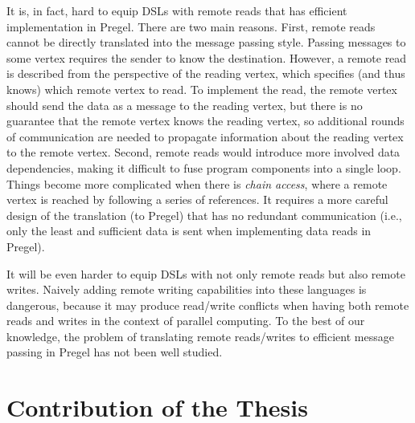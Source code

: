 \documentclass{sokendai_thesis} %
\begin{document}
It is, in fact, hard to equip DSLs with remote reads that has efficient implementation in Pregel.
There are two main reasons.
First, remote reads cannot be directly translated into the message passing style.
Passing messages to some vertex requires the sender to know the destination.
However, a remote read is described from the perspective of the reading vertex, which specifies (and thus knows) which remote vertex to read.
To implement the read, the remote vertex should send the data as a message to the reading vertex, but there is no guarantee that the remote vertex knows the reading vertex, so additional rounds of communication are needed to propagate information about the reading vertex to the remote vertex.
Second, remote reads would introduce more involved data dependencies, making it difficult to fuse program components into a single loop.
Things become more complicated when there is \emph{chain access}, where a remote vertex is reached by following a series of references.
It requires a more careful design of the translation (to Pregel) that has no redundant communication (i.e., only the least and sufficient data is sent when implementing data reads in Pregel).

It will be even harder to equip DSLs with not only remote reads but also remote writes.
Naively adding remote writing capabilities into these languages is dangerous, because it may produce read/write conflicts when having both remote reads and writes in the context of parallel computing.
To the best of our knowledge, the problem of translating remote reads/writes to efficient message passing in Pregel has not been well studied.  

\section{Contribution of the Thesis}
\end{document}
